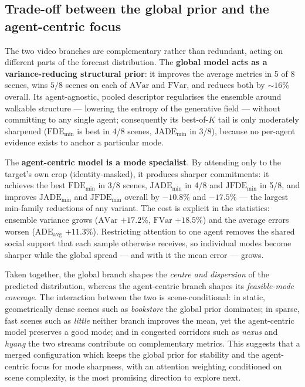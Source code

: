 \documentclass[11pt,a4paper]{article}
\begin{document}
\subsection{Trade-off between the global prior and the agent-centric focus}

The two video branches are complementary rather than redundant, acting on
different parts of the forecast distribution. The \textbf{global model acts as
a variance-reducing structural prior}: it improves the average metrics in 5 of
8 scenes, wins $5/8$ scenes on each of $\mathrm{AVar}$ and $\mathrm{FVar}$, and
reduces both by $\sim 16\%$ overall. Its agent-agnostic, pooled descriptor
regularises the ensemble around walkable structure --- lowering the entropy of
the generative field --- without committing to any single agent; consequently
its best-of-$K$ tail is only moderately sharpened ($\mathrm{FDE_{min}}$ is best
in 4/8 scenes, $\mathrm{JADE_{min}}$ in 3/8), because no per-agent evidence
exists to anchor a particular mode.

The \textbf{agent-centric model is a mode specialist}. By attending only to the
target's own crop (identity-masked), it produces sharper commitments: it
achieves the best $\mathrm{FDE_{min}}$ in 3/8 scenes, $\mathrm{JADE_{min}}$ in
4/8 and $\mathrm{JFDE_{min}}$ in 5/8, and improves $\mathrm{JADE_{min}}$ and
$\mathrm{JFDE_{min}}$ overall by $-10.8\%$ and $-17.5\%$ --- the largest
min-family reductions of any variant. The cost is explicit in the statistics:
ensemble variance grows ($\mathrm{AVar}$ $+17.2\%$, $\mathrm{FVar}$ $+18.5\%$)
and the average errors worsen ($\mathrm{ADE_{avg}}$ $+11.3\%$). Restricting
attention to one agent removes the shared social support that each sample
otherwise receives, so individual modes become sharper while the global spread
--- and with it the mean error --- grows.

Taken together, the global branch shapes the \emph{centre and dispersion} of
the predicted distribution, whereas the agent-centric branch shapes its
\emph{feasible-mode coverage}. The interaction between the two is
scene-conditional: in static, geometrically dense scenes such as
\emph{bookstore} the global prior dominates; in sparse, fast scenes such as
\emph{little} neither branch improves the mean, yet the agent-centric model
preserves a good mode; and in congested corridors such as \emph{nexus} and
\emph{hyang} the two streams contribute on complementary metrics. This suggests
that a merged configuration which keeps the global prior for stability and the
agent-centric focus for mode sharpness, with an attention weighting conditioned
on scene complexity, is the most promising direction to explore next.
\end{document}
